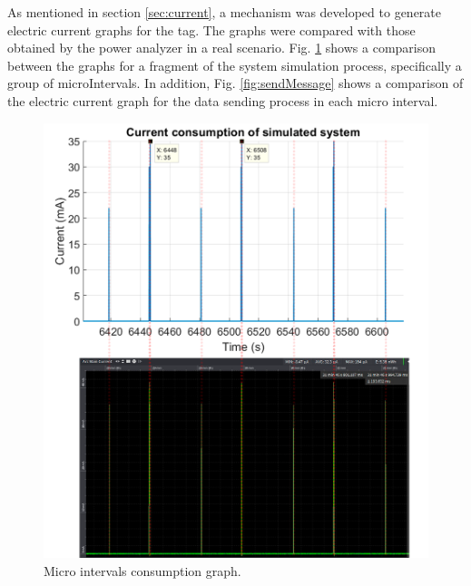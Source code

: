 \documentclass[journal]{IEEEtran}	%
\begin{document}
As mentioned in section \ref{sec:current}, a mechanism was developed to generate electric current graphs for the tag. The graphs were compared with those obtained by the power analyzer in a real scenario. Fig. \ref{fig:microIntervals} shows a comparison between the graphs for a fragment of the system simulation process, specifically a group of microIntervals. In addition, Fig. \ref{fig:sendMessage} shows a comparison of the electric current graph for the data sending process in each micro interval.

\begin{figure}[t!]
\centering
\includegraphics[width=0.99\columnwidth]{microIntervalsAll.png}
\caption{Micro intervals consumption graph.}
\label{fig:microIntervals}
\end{figure}
\end{document}
